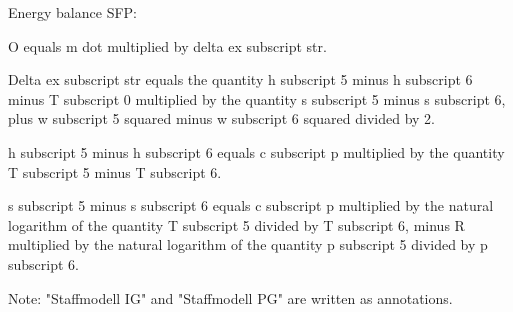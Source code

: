 Energy balance SFP:  

O equals m dot multiplied by delta ex subscript str.  

Delta ex subscript str equals the quantity h subscript 5 minus h subscript 6 minus T subscript 0 multiplied by the quantity s subscript 5 minus s subscript 6, plus w subscript 5 squared minus w subscript 6 squared divided by 2.  

h subscript 5 minus h subscript 6 equals c subscript p multiplied by the quantity T subscript 5 minus T subscript 6.  

s subscript 5 minus s subscript 6 equals c subscript p multiplied by the natural logarithm of the quantity T subscript 5 divided by T subscript 6, minus R multiplied by the natural logarithm of the quantity p subscript 5 divided by p subscript 6.  

Note: "Staffmodell IG" and "Staffmodell PG" are written as annotations.